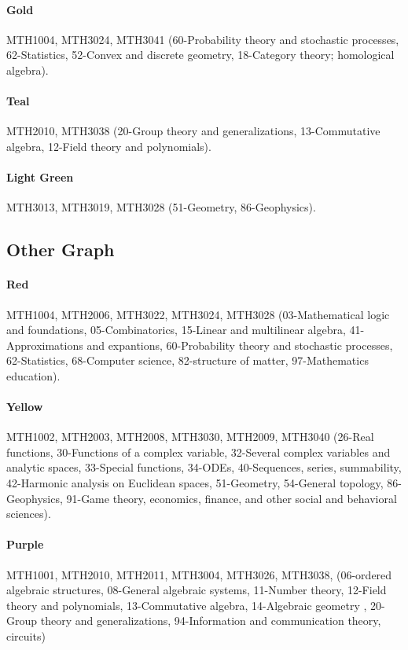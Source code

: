 \documentclass[english, 12pt]{article}
\begin{document}
\paragraph{Gold} MTH1004, MTH3024, MTH3041 (60-Probability theory and stochastic processes, 62-Statistics, 52-Convex and discrete geometry, 18-Category theory; homological algebra).
\paragraph{Teal} MTH2010, MTH3038 (20-Group theory and generalizations, 13-Commutative algebra, 12-Field theory and polynomials).
\paragraph{Light Green} MTH3013, MTH3019, MTH3028 (51-Geometry, 86-Geophysics).
\parskip=0.0pt

\subsection{Other Graph} \label{app:other_graph_communities}
\paragraph{Red} MTH1004, MTH2006, MTH3022, MTH3024, MTH3028 (03-Mathematical logic and foundations, 05-Combinatorics, 15-Linear and multilinear algebra, 41-Approximations and expantions, 60-Probability theory and stochastic processes, 62-Statistics, 68-Computer science, 82-structure of matter, 97-Mathematics education).
\parskip=-16.0pt
\paragraph{Yellow} MTH1002, MTH2003, MTH2008, MTH3030, MTH2009, MTH3040 (26-Real functions, 30-Functions of a complex variable, 32-Several complex variables and analytic spaces, 33-Special functions, 34-ODEs, 40-Sequences, series, summability, 42-Harmonic analysis on Euclidean spaces, 51-Geometry, 54-General topology, 86-Geophysics, 91-Game theory, economics, finance, and other social and behavioral sciences).
\paragraph{Purple} MTH1001, MTH2010, MTH2011, MTH3004, MTH3026, MTH3038, (06-ordered algebraic structures, 08-General algebraic systems, 11-Number theory, 12-Field theory and polynomials, 13-Commutative algebra, 14-Algebraic geometry , 20-Group theory and generalizations, 94-Information and communication theory, circuits)
\end{document}
